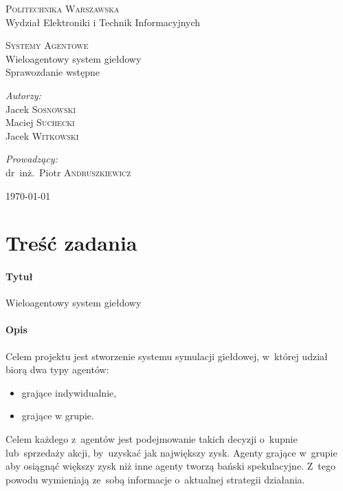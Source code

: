 \documentclass[11pt,a4paper]{article}
\begin{document}
\begin{titlepage}
  \begin{center}

    \textsc{\Large Politechnika Warszawska}\\[0.1cm]
    \small Wydział Elektroniki i Technik Informacyjnych
    \vfill

    \textsc{\small Systemy Agentowe}\\[0.1cm]
    \Huge Wieloagentowy system giełdowy\\[1.5cm]
    \small Sprawozdanie wstępne\\[2.5cm]

    \vfill

    \begin{minipage}{0.4\textwidth}
      \begin{flushleft} \large
        \emph{Autorzy:}\\[0.1cm]
        Jacek \textsc{Sosnowski}\\
        Maciej \textsc{Suchecki}\\
        Jacek \textsc{Witkowski}\\
      \end{flushleft}
    \end{minipage}
    \begin{minipage}{0.4\textwidth}
      \begin{flushright} \large
        \emph{Prowadzący:}\\[0.1cm]
        dr~inż.~Piotr \textsc{Andruszkiewicz}\\[1cm]
      \end{flushright}
    \end{minipage}

    \vfill
    {\large \today}

  \end{center}
\end{titlepage}

\section{Treść zadania}
\paragraph{Tytuł} Wieloagentowy system giełdowy
\paragraph{Opis}
Celem projektu jest stworzenie systemu symulacji giełdowej, w~której udział biorą dwa typy agentów:
\begin{itemize}
  \item grające indywidualnie,
  \item grające w grupie.
\end{itemize}
Celem każdego z~agentów jest podejmowanie takich decyzji o~kupnie lub~sprzedaży akcji, by~uzyskać jak największy zysk. Agenty grające w~grupie aby osiągnąć większy zysk niż inne agenty tworzą bański spekulacyjne. Z~tego powodu wymieniają ze~sobą informacje o~aktualnej strategii działania.
\end{document}
